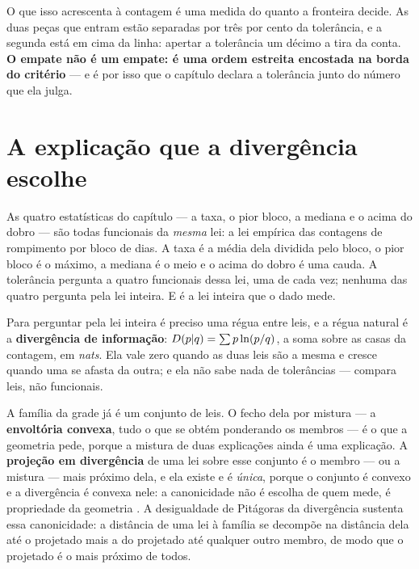 O que isso acrescenta à contagem é uma medida do quanto a fronteira decide. As duas peças que entram
estão separadas por três por cento da tolerância, e a segunda está em cima da linha: apertar a
tolerância um décimo a tira da conta. \textbf{O empate não é um empate: é uma ordem estreita
encostada na borda do critério} --- e é por isso que o capítulo declara a tolerância junto do número
que ela julga.

\section{A explicação que a divergência escolhe}

As quatro estatísticas do capítulo --- a taxa, o pior bloco, a mediana e o acima do dobro ---
são todas funcionais da \emph{mesma} lei: a lei empírica das contagens de rompimento por bloco de
\numBlocoDias{} dias. A taxa é a média dela dividida pelo bloco, o pior bloco é o máximo, a
mediana é o meio e o acima do dobro é uma cauda. A tolerância pergunta a quatro funcionais dessa
lei, uma de cada vez; nenhuma das quatro pergunta pela lei inteira. E é a lei inteira que o dado
mede.

Para perguntar pela lei inteira é preciso uma régua entre leis, e a régua natural é a
\textbf{divergência de informação}: $D(p\\|q) = \sum p \ln(p/q)$, a soma sobre as casas da contagem, em
\emph{nats}. Ela vale zero quando as duas leis são a mesma e cresce quando uma se afasta da
outra; e ela não sabe nada de tolerâncias --- compara leis, não funcionais.

A família da grade já é um conjunto de leis. O fecho dela por mistura --- a \textbf{envoltória
convexa}, tudo o que se obtém ponderando os membros --- é o que a geometria pede, porque a
mistura de duas explicações ainda é uma explicação. A \textbf{projeção em divergência} de uma
lei sobre esse conjunto é o membro --- ou a mistura --- mais próximo dela, e ela existe e é
\emph{única}, porque o conjunto é convexo e a divergência é convexa nele: a canonicidade não é
escolha de quem mede, é propriedade da geometria \cite{csiszar1975divergence}.
A desigualdade de Pitágoras da divergência sustenta essa canonicidade: a distância de uma lei à família se decompõe na distância dela até o projetado mais a do projetado até qualquer outro membro, de modo que o projetado é o mais próximo de todos.

